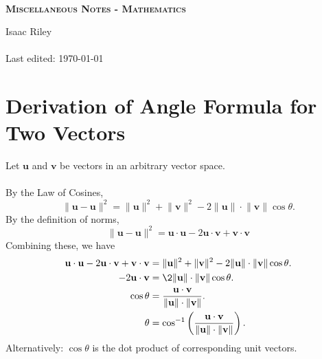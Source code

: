 \documentclass[a4, 12pt]{article}
\newcommand{\vecv}{\textbf{v}}
\newcommand{\vecu}{\textbf{u}}
\begin{document}
\begin{titlepage}


\thispagestyle{fancy}

\vphantom{x}

\vspace{0.5in}

\center


\textsc{\large }

\vspace{0.5in}

\noindent\makebox[\linewidth]{\rule{\linewidth}{1.2pt}}\\
\vspace{2mm}
\textsc{ \textbf{\large Miscellaneous Notes - Mathematics }}
\noindent\makebox[\linewidth]{\rule{\linewidth}{1.2pt}}

\vspace{2.5in}
Isaac Riley\\~\\

Last edited: \today

\end{titlepage}

\newpage

\setcounter{page}{2}
\tableofcontents
\newpage
\section{Derivation of Angle Formula for Two Vectors}
Let $\vecu$ and $\vecv$ be vectors in an arbitrary vector space. \\~\\
By the Law of Cosines, $$\lVert\vecu - \vecu\rVert^2 = \lVert\vecu\rVert^2+\lVert\vecv\rVert^2-2\lVert\vecu\rVert\cdot\lVert\vecv\rVert\cos \theta.$$
By the definition of norms, $$\lVert\vecu - \vecu\rVert^2 = \vecu \cdot \vecu - 2 \vecu \cdot \vecv + \vecv \cdot \vecv$$
Combining these, we have 
\begin{align*}
\vecu \cdot \vecu - 2 \vecu \cdot \vecv + \vecv \cdot \vecv &= \lVert\vecu\rVert^2+\lVert\vecv\rVert^2-2\lVert\vecu\rVert\cdot\lVert\vecv\rVert\cos \theta.\\
-2\vecu \cdot \vecv &= \2 \lVert\vecu\rVert \cdot \lVert\vecv\rVert \cos \theta.\\
\cos \theta &= \dfrac{\vecu \cdot \vecv}{\lVert\vecu\rVert \cdot \lVert\vecv\rVert}.\\
\theta &= 
\cos^{-1}
\left( 
\dfrac{\vecu \cdot \vecv}{\lVert \vecu \rVert \cdot \lVert \vecv \rVert} 
\right).
\end{align*}
Alternatively: $\cos \theta$ is the dot product of corresponding unit vectors.
\end{document}
